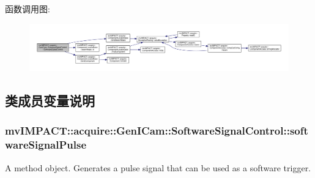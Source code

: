 函数调用图\+:
\nopagebreak
\begin{figure}[H]
\begin{center}
\leavevmode
\includegraphics[width=350pt]{classmv_i_m_p_a_c_t_1_1acquire_1_1_gen_i_cam_1_1_software_signal_control_a3e52bba0ee1a97727f77a7cf504528ff_cgraph}
\end{center}
\end{figure}




\subsection{类成员变量说明}
\hypertarget{classmv_i_m_p_a_c_t_1_1acquire_1_1_gen_i_cam_1_1_software_signal_control_a143f6e56fee1cb62e4140974790ba247}{
\subsubsection[{software\+Signal\+Pulse}]{ mv\+I\+M\+P\+A\+C\+T\+::acquire\+::\+Gen\+I\+Cam\+::\+Software\+Signal\+Control\+::software\+Signal\+Pulse}}\label{classmv_i_m_p_a_c_t_1_1acquire_1_1_gen_i_cam_1_1_software_signal_control_a143f6e56fee1cb62e4140974790ba247}


A method object. Generates a pulse signal that can be used as a software trigger. 

